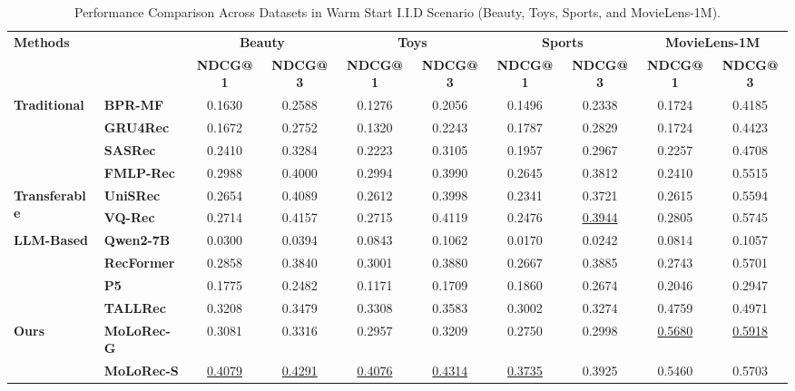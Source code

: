 \begin{table*}[h]
\small
\centering
\caption{Performance Comparison Across Datasets in Warm Start I.I.D Scenario (Beauty, Toys, Sports, and MovieLens-1M).}
\begin{adjustbox}{max width=\textwidth}
\begin{tabular}{ll|cc|cc|cc||cc}
\toprule
\multirow{2}{*}{\textbf{Methods}} & \multirow{2}{*}{} & \multicolumn{2}{c|}{\textbf{Beauty}} & \multicolumn{2}{c|}{\textbf{Toys}} & \multicolumn{2}{c||}{\textbf{Sports}} & \multicolumn{2}{c}{\textbf{MovieLens-1M}} \\ 
 & & \textbf{NDCG@1} & \textbf{NDCG@3} & \textbf{NDCG@1} & \textbf{NDCG@3} & \textbf{NDCG@1} & \textbf{NDCG@3} & \textbf{NDCG@1} & \textbf{NDCG@3} \\ 
\midrule
\multirow{4}{*}{\textbf{Traditional}} 
& \textbf{BPR-MF} &  0.1630 & 0.2588 & 0.1276 & 0.2056 & 0.1496 & 0.2338 & 0.1724 & 0.4185 \\ 
& \textbf{GRU4Rec} & 0.1672 & 0.2752 & 0.1320 & 0.2243 & 0.1787 & 0.2829 & 0.1724 &  0.4423\\ 
& \textbf{SASRec} & 0.2410 & 0.3284 & 0.2223 & 0.3105 & 0.1957 & 0.2967 & 0.2257 & 0.4708 \\ 
& \textbf{FMLP-Rec}& 0.2988 & 0.4000 & 0.2994 & 0.3990 & 0.2645 & 0.3812 & 0.2410 & 0.5515 \\ 
\midrule
\multirow{2}{*}{\textbf{Transferable}} 
& \textbf{UniSRec} & 0.2654 & 0.4089 & 0.2612 & 0.3998 & 0.2341 & 0.3721 & 0.2615 & 0.5594 \\ 
& \textbf{VQ-Rec} & 0.2714 & 0.4157 & 0.2715 & 0.4119 & 0.2476 & \underline{0.3944} & 0.2805 & 0.5745 \\ 
\midrule
\multirow{4}{*}{\textbf{LLM-Based}} 
& \textbf{Qwen2-7B} & 0.0300 & 0.0394 & 0.0843 & 0.1062 & 0.0170 & 0.0242 & 0.0814 & 0.1057  \\ 
& \textbf{RecFormer} & 0.2858 & 0.3840 & 0.3001 & 0.3880 & 0.2667 & 0.3885 & 0.2743 & 0.5701 \\ 
& \textbf{P5} & 0.1775 & 0.2482 & 0.1171 & 0.1709 & 0.1860 & 0.2674 & 0.2046 & 0.2947\\ 
& \textbf{TALLRec} & 0.3208 & 0.3479 & 0.3308 & 0.3583 & 0.3002 & 0.3274 & 0.4759 & 0.4971\\ 
\midrule
\multirow{3}{*}{\textbf{Ours}} 
& \textbf{MoLoRec-G} & 0.3081 & 0.3316 & 0.2957 & 0.3209 & 0.2750 & 0.2998 & \underline{0.5680} & \underline{0.5918} \\
& \textbf{MoLoRec-S} & \underline{0.4079} & \underline{0.4291} & \underline{0.4076} & \underline{0.4314} & \underline{0.3735} & 0.3925 & 0.5460 & 0.5703\\

\end{tabular}
\end{adjustbox}
\end{table*}
